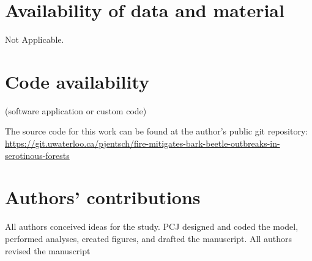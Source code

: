\section*{Availability of data and material}

Not Applicable.

\section*{Code availability} (software application or custom code)

The source code for this work can be found at the author's public git repository: \url{https://git.uwaterloo.ca/pjentsch/fire-mitigates-bark-beetle-outbreaks-in-serotinous-forests}


\section*{Authors' contributions}
All authors conceived ideas for the study. PCJ designed and coded the model, performed analyses, created figures, and drafted the manuscript. All authors revised the manuscript

